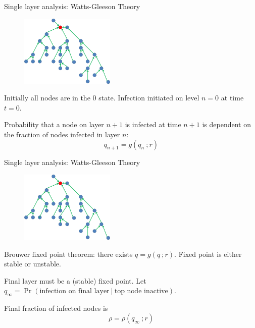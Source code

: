 \documentclass[10pt, xcolor=dvipsnames]{beamer}
\begin{document}
\begin{frame}{Single layer analysis: Watts-Gleeson Theory}

\begin{figure}[htb]
\includegraphics[width=0.4\textwidth]{figures/tree.png}
\end{figure}

Initially all nodes are in the 0 state. Infection initiated on level $n=0$ at time $t=0$.

{\pause Probability that a node on layer $n+1$ is infected at time $n+1$ is dependent on the fraction of nodes infected in layer $n$:
\begin{equation}
q_{n+1} = g(q_n\ ; r)
\end{equation}
}


\end{frame}

\begin{frame}{Single layer analysis: Watts-Gleeson Theory}

\begin{figure}[htb]
\includegraphics[width=0.4\textwidth]{figures/tree.png}
\end{figure}

\pause Brouwer fixed point theorem: there exists $q = g(q\ ; r)$. Fixed point is either stable or unstable.

\pause Final layer must be a (stable) fixed point. Let $q_\infty = \Pr(\text{infection on final layer} \ | \ \text{top node inactive})$.

\pause Final fraction of infected nodes is
\begin{equation}
\rho = \rho(q_\infty\ ; r)
\end{equation}

\end{frame}
\end{document}
